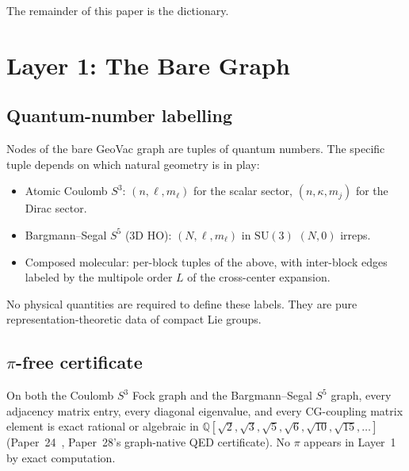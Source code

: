 \documentclass[11pt]{article}
\begin{document}
The remainder of this paper is the dictionary.

\section{Layer 1: The Bare Graph}
\label{sec:layer1}


\subsection{Quantum-number labelling}
\label{sec:layer1_labels}
Nodes of the bare GeoVac graph are tuples of quantum numbers.  The
specific tuple depends on which natural geometry is in play:
\begin{itemize}
\setlength\itemsep{0pt}
\item Atomic Coulomb $S^3$: $(n, \ell, m_\ell)$ for the scalar sector,
$(n, \kappa, m_j)$ for the Dirac sector.
\item Bargmann--Segal $S^5$ (3D HO): $(N, \ell, m_\ell)$ in $\mathrm{SU}(3)$
$(N, 0)$ irreps.
\item Composed molecular: per-block tuples of the above, with
inter-block edges labeled by the multipole order $L$ of the
cross-center expansion.
\end{itemize}
No physical quantities are required to define these labels.  They
are pure representation-theoretic data of compact Lie groups.

\subsection{$\pi$-free certificate}
\label{sec:layer1_pi_free}
On both the Coulomb $S^3$ Fock graph and the Bargmann--Segal $S^5$
graph, every adjacency matrix entry, every diagonal eigenvalue, and
every CG-coupling matrix element is exact rational or algebraic in
$\mathbb{Q}[\sqrt{2}, \sqrt{3}, \sqrt{5}, \sqrt{6}, \sqrt{10},
\sqrt{15}, \ldots]$ (Paper~24~\cite{paper24}, Paper~28's
graph-native QED certificate).  No $\pi$ appears in Layer~1 by
exact computation.
\end{document}
